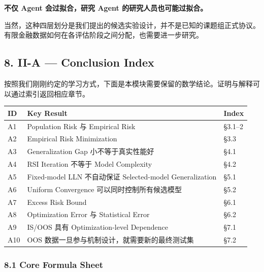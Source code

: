 \textbf{不仅 Agent 会过拟合，研究 Agent 的研究人员也可能过拟合。}

当然，这种四层划分是我们提出的候选实验设计，并不是已知的课题组正式协议。有限金融数据如何在各评估阶段之间分配，也需要进一步研究。

\hypertarget{part-2-12-0001-ii-a-conclusion-index}{%
\subsection{8. II-A --- Conclusion Index}\label{part-2-12-0001-ii-a-conclusion-index}}

按照我们刚刚约定的学习方式，下面是本模块需要保留的数学结论。证明与解释可以通过索引返回相应章节。

\begin{readertable}
\begin{longtable}[]{@{}
  >{\raggedright\arraybackslash}p{}
  >{\raggedright\arraybackslash}p{}
  >{\raggedright\arraybackslash}p{}@{}}
\toprule
ID & Key Result & Index \\
\midrule
\endhead
A1 & Population Risk 与 Empirical Risk & §3.1--2 \\
A2 & Empirical Risk Minimization & §3.3 \\
A3 & Generalization Gap 小不等于真实性能好 & §4.1 \\
A4 & RSI Iteration 不等于 Model Complexity & §4.2 \\
A5 & Fixed-model LLN 不自动保证 Selected-model Generalization & §5.1 \\
A6 & Uniform Convergence 可以同时控制所有候选模型 & §5.2 \\
A7 & Excess Risk Bound & §6.1 \\
A8 & Optimization Error 与 Statistical Error & §6.2 \\
A9 & IS/OOS 具有 Optimization-level Dependence & §7.1 \\
A10 & OOS 数据一旦参与机制设计，就需要新的最终测试集 & §7.2 \\
\bottomrule
\end{longtable}
\end{readertable}

\hypertarget{part-2-12-0001-core-formula-sheet}{%
\subsubsection{8.1 Core Formula Sheet}\label{part-2-12-0001-core-formula-sheet}}

